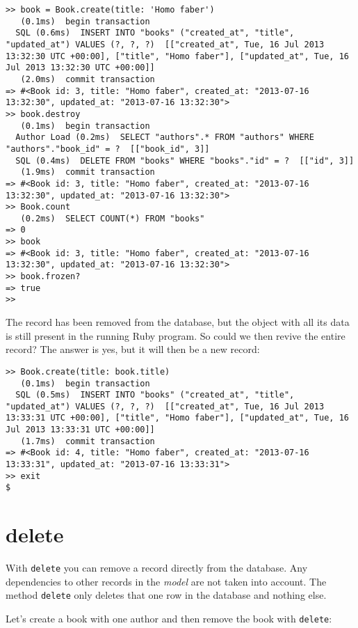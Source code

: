 \documentclass[a4paper]{book}
\newcounter{tab}[chapter]
\newcommand{\chap}[1]{\newpage\thispagestyle{empty}\chapter{#1}\label{chap:\thechapter}}
\begin{document}
\begin{shaded}\begin{verbatim}
>> book = Book.create(title: 'Homo faber')
   (0.1ms)  begin transaction
  SQL (0.6ms)  INSERT INTO "books" ("created_at", "title", "updated_at") VALUES (?, ?, ?)  [["created_at", Tue, 16 Jul 2013 13:32:30 UTC +00:00], ["title", "Homo faber"], ["updated_at", Tue, 16 Jul 2013 13:32:30 UTC +00:00]]
   (2.0ms)  commit transaction
=> #<Book id: 3, title: "Homo faber", created_at: "2013-07-16 13:32:30", updated_at: "2013-07-16 13:32:30">
>> book.destroy
   (0.1ms)  begin transaction
  Author Load (0.2ms)  SELECT "authors".* FROM "authors" WHERE "authors"."book_id" = ?  [["book_id", 3]]
  SQL (0.4ms)  DELETE FROM "books" WHERE "books"."id" = ?  [["id", 3]]
   (1.9ms)  commit transaction
=> #<Book id: 3, title: "Homo faber", created_at: "2013-07-16 13:32:30", updated_at: "2013-07-16 13:32:30">
>> Book.count
   (0.2ms)  SELECT COUNT(*) FROM "books"
=> 0
>> book
=> #<Book id: 3, title: "Homo faber", created_at: "2013-07-16 13:32:30", updated_at: "2013-07-16 13:32:30">
>> book.frozen?
=> true
>>
\end{verbatim}\end{shaded}

The record has been removed from the database, but the object with all its data is still present in the running Ruby program. So could we then revive the entire record? The answer is yes, but it will then be a new record:

\begin{shaded}\begin{verbatim}
>> Book.create(title: book.title)
   (0.1ms)  begin transaction
  SQL (0.5ms)  INSERT INTO "books" ("created_at", "title", "updated_at") VALUES (?, ?, ?)  [["created_at", Tue, 16 Jul 2013 13:33:31 UTC +00:00], ["title", "Homo faber"], ["updated_at", Tue, 16 Jul 2013 13:33:31 UTC +00:00]]
   (1.7ms)  commit transaction
=> #<Book id: 4, title: "Homo faber", created_at: "2013-07-16 13:33:31", updated_at: "2013-07-16 13:33:31">
>> exit
$
\end{verbatim}\end{shaded}

\chap{delete}\label{delete}

With \texttt{delete} you can remove a record directly from the database. Any dependencies to other records in the \emph{model} are not taken into account. The method \texttt{delete} only deletes that one row in the database and nothing else.

Let's create a book with one author and then remove the book with \texttt{delete}:
\end{document}
